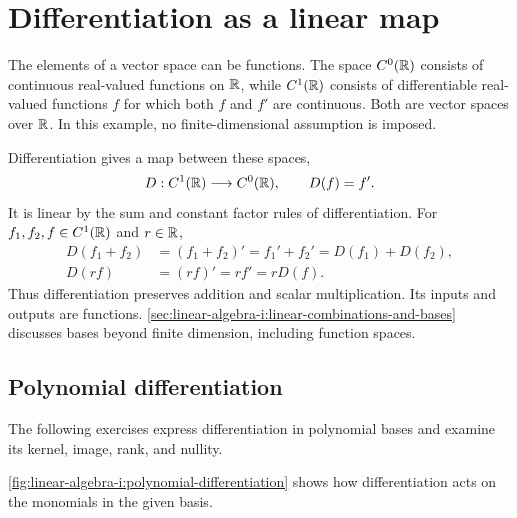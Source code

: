 \section{Differentiation as a linear map}
\label{sec:linear-algebra-i:differentiation}

The elements of a vector space can be functions. The space \(C^0(\mathbb{R})\)
consists of continuous real-valued functions on \(\mathbb{R}\), while \(C^1(\mathbb{R})\)
consists of differentiable real-valued functions \(f\) for which both
\(f\) and \(f'\) are continuous. Both are vector spaces over \(\mathbb{R}\).
In this example, no finite-dimensional assumption is imposed.

Differentiation gives a map between these spaces,
\[
  D:C^1(\mathbb{R})\longrightarrow C^0(\mathbb{R}),\qquad D(f)=f'.
\]
It is linear by the sum and constant factor rules of differentiation.
For \(f_1,f_2,f\in C^1(\mathbb{R})\) and \(r\in\mathbb{R}\),
\[
  \begin{aligned}
    D(f_1+f_2)&=(f_1+f_2)'=f_1'+f_2'=D(f_1)+D(f_2),\\
    D(rf)&=(rf)'=rf'=rD(f).
  \end{aligned}
\]
Thus differentiation preserves addition and scalar multiplication.
Its inputs and outputs are functions.
\autoref{sec:linear-algebra-i:linear-combinations-and-bases}
discusses bases beyond finite dimension, including function spaces.

\newpage
\subsection{Polynomial differentiation}

The following exercises express differentiation in polynomial bases and
examine its kernel, image, rank, and nullity.




\autoref{fig:linear-algebra-i:polynomial-differentiation} shows how
differentiation acts on the monomials in the given basis.
\begin{marginfigure}
  \centering
  
  \caption[Differentiation of monomials]{The basis images for
    \(D:\mathcal P_3(\R)\to\mathcal P_2(\R)\). Constants go to zero.
    The other monomials lose one degree.}
  \label{fig:linear-algebra-i:polynomial-differentiation}
\end{marginfigure}
